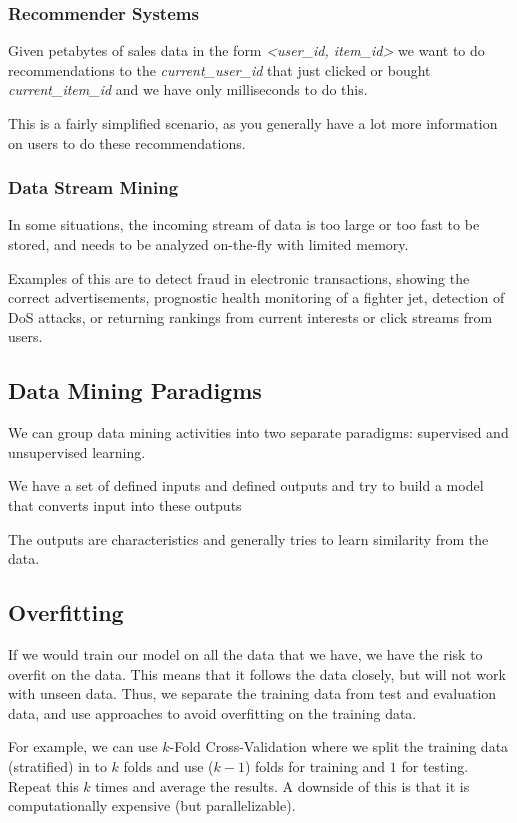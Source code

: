 \subsubsection{Recommender Systems}

Given petabytes of sales data in the form \textit{<user\_id, item\_id>}
we want to do recommendations to the \textit{current\_user\_id}
that just clicked or bought \textit{current\_item\_id} and
we have only milliseconds to do this.

This is a fairly simplified scenario, as you generally have
a lot more information on users to do these recommendations.

\subsubsection{Data Stream Mining}

In some situations, the incoming stream of data is too large
or too fast to be stored, and needs to be analyzed on-the-fly
with limited memory.

Examples of this are to detect fraud in electronic transactions, showing
the correct advertisements, prognostic health monitoring of a fighter jet,
detection of DoS attacks, or returning rankings from current interests
or click streams from users.

\subsection{Data Mining Paradigms}

We can group data mining activities into two separate paradigms: supervised
and unsupervised learning.

\begin{definition}
  We have a set of defined inputs and defined outputs and
  try to build a model that converts input into these outputs
\end{definition}

\begin{definition}
  The outputs are characteristics and generally tries to learn
  similarity from the data.
\end{definition}

\subsection{Overfitting}

If we would train our model on all the data that we have, we
have the risk to overfit on the data. This means that it follows
the data closely, but will not work with unseen data. Thus, we
separate the training data from test and evaluation data, and
use approaches to avoid overfitting on the training data.

For example, we can use $k$-Fold Cross-Validation where we split
the training data (stratified) in to $k$ folds and use ($k - 1$)
folds for training and $1$ for testing. Repeat this $k$ times
and average the results. A downside of this is that it is
computationally expensive (but parallelizable).

